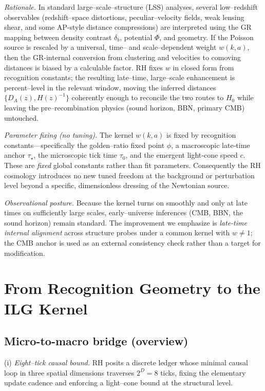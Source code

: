 \documentclass[11pt]{article}
\begin{document}
\medskip
\noindent\textit{Rationale.} In standard large–scale–structure (LSS) analyses, several low–redshift observables (redshift–space distortions, peculiar–velocity fields, weak lensing shear, and some AP-style distance compressions) are interpreted using the GR mapping between density contrast \(\delta_b\), potential \(\Phi\), and geometry. If the Poisson source is rescaled by a universal, time– and scale–dependent weight \(w(k,a)\), then the GR-internal conversion from clustering and velocities to comoving distances is biased by a calculable factor. RH fixes \(w\) in closed form from recognition constants; the resulting late–time, large–scale enhancement is percent–level in the relevant window, moving the inferred distances \(\{D_A(z), H(z)^{-1}\}\) coherently enough to reconcile the two routes to \(H_0\) while leaving the pre–recombination physics (sound horizon, BBN, primary CMB) untouched.

\medskip
\noindent\textit{Parameter fixing (no tuning).} The kernel \(w(k,a)\) is fixed by recognition constants—specifically the golden–ratio fixed point \(\phi\), a macroscopic late‑time anchor \(\tau_\star\), the microscopic tick time \(\tau_0\), and the emergent light‑cone speed \(c\). These are \emph{fixed} global constants rather than fit parameters. Consequently the RH cosmology introduces no new tuned freedom at the background or perturbation level beyond a specific, dimensionless dressing of the Newtonian source.

\medskip
\noindent\textit{Observational posture.} Because the kernel turns on smoothly and only at late times on sufficiently large scales, early–universe inferences (CMB, BBN, the sound horizon) remain standard. The improvement we emphasize is \emph{late-time internal alignment} across structure probes under a common kernel with \(w\neq 1\); the CMB anchor is used as an external consistency check rather than a target for modification.


\section{From Recognition Geometry to the ILG Kernel}

\subsection{Micro-to-macro bridge (overview)}

(i) \emph{Eight–tick causal bound.} RH posits a discrete ledger whose minimal causal loop in three spatial dimensions traverses \(2^D=8\) ticks, fixing the elementary update cadence and enforcing a light–cone bound at the structural level.
\end{document}

